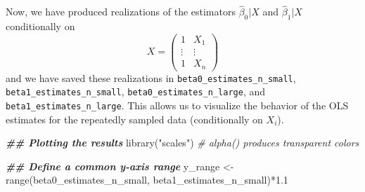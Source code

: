 \documentclass[
  14pt,
]{memoir}
\newenvironment{Shaded}{\begin{snugshade}}{\end{snugshade}}
\newcommand{\CommentTok}[1]{\textcolor[rgb]{0.56,0.35,0.01}{\textit{#1}}}
\newcommand{\DocumentationTok}[1]{\textcolor[rgb]{0.56,0.35,0.01}{\textbf{\textit{#1}}}}
\newcommand{\FloatTok}[1]{\textcolor[rgb]{0.00,0.00,0.81}{#1}}
\newcommand{\FunctionTok}[1]{\textcolor[rgb]{0.00,0.00,0.00}{#1}}
\newcommand{\NormalTok}[1]{#1}
\newcommand{\OtherTok}[1]{\textcolor[rgb]{0.56,0.35,0.01}{#1}}
\newcommand{\SpecialCharTok}[1]{\textcolor[rgb]{0.00,0.00,0.00}{#1}}
\newcommand{\StringTok}[1]{\textcolor[rgb]{0.31,0.60,0.02}{#1}}
\begin{document}
Now, we have produced realizations of the estimators \(\hat\beta_0|X\) and \(\hat\beta_1|X\) conditionally on \[X=\begin{pmatrix}1&X_1\\\vdots&\vdots\\1&X_n\end{pmatrix}\]
and we have saved these realizations in \texttt{beta0\_estimates\_n\_small}, \texttt{beta1\_estimates\_n\_small}, \texttt{beta0\_estimates\_n\_large}, and \newline
\texttt{beta1\_estimates\_n\_large}. This allows us to visualize the behavior of the OLS estimates for the repeatedly sampled data (conditionally on \(X_i\)).

\begin{Shaded}
\begin{Highlighting}[]
\DocumentationTok{\#\# Plotting the results}
\FunctionTok{library}\NormalTok{(}\StringTok{"scales"}\NormalTok{) }\CommentTok{\# alpha() produces transparent colors}

\DocumentationTok{\#\# Define a common y{-}axis range}
\NormalTok{y\_range }\OtherTok{\textless{}{-}} \FunctionTok{range}\NormalTok{(beta0\_estimates\_n\_small,}
\NormalTok{                 beta1\_estimates\_n\_small)}\SpecialCharTok{*}\FloatTok{1.1}


\end{Highlighting}
\end{Shaded}
\end{document}
